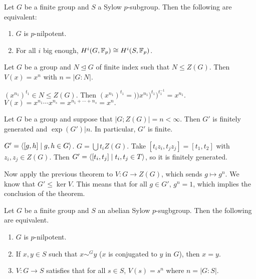 \documentclass[twoside, 11pt]{article}
\begin{document}
\begin{teorema}[Atiyah]
Let $G$ be a finite group and $S$ a Sylow $p$-subgroup. Then the following are equivalent:
\begin{enumerate}
\item $G$ is $p$-nilpotent.
\item For all $i$ big enough, $H^i(G,\mathbb{F}_p)\cong H^i(S,\mathbb{F}_p)$. 
\end{enumerate}
\end{teorema}



\begin{teorema}
Let $G$ be a group and $N\trianglelefteq G$ of finite index such that $N\leq Z(G)$. Then $V(x)=x^n$ with $n=|G:N|$.
 \end{teorema}
 \begin{dem}
 $(x^{n_1})^{t_1}\in N\leq Z(G)$. Then $(x^{n_1})^{t_1}=))x^{n_1})^{t_1})^{t_1^{-1}}=x^{n_1}$. $V(x)=x^{n_1}\cdots x^{n_s}=x^{n_1+\cdots+n_s}=x^n.$
 \end{dem}
 
 \begin{teorema}
Let $G$ be a group and suppose that $|G;Z(G)|=n<\infty$. Then $G'$ is finitely generated and $\exp(G')|n$. In particular, $G'$ is finite. 
\end{teorema}
\begin{dem}
$G'=\langle{[g,h]\mid g,h\in G}\rangle$. $G=\bigcup t_iZ(G)$. Take $[t_iz_i, t_jz_j]=[t_1,t_2]$ with $z_i,z_j\in Z(G)$. Then $G'=\langle{[t_i,t_j]\mid t_i,t_j\in T}\rangle$, so it is finitely generated. 

Now apply the previous theorem to $V:G\to Z(G)$, which sends $g\mapsto g^n$. We know that $G'\leq \ker V$. This means that for all $g\in G'$, $g^n=1$, which implies the conclusion of the theorem. 
\end{dem}

\begin{teorema}
Let $G$ be a finite group and $S$ an abelian Sylow $p$-sugbgroup. Then the following are equivalent.
\begin{enumerate}
\item $G$ is $p$-nilpotent.
\item If $x,y\in S$ such that $x\sim^G y$ ($x$ is conjugated to $y$ in $G$), then $x=y$. 
\item $V:G\to S$ satisfies that for all $s\in S$, $V(s)=s^n$ where $n=|G:S|$. 
\end{enumerate}
\end{teorema}
\end{document}
